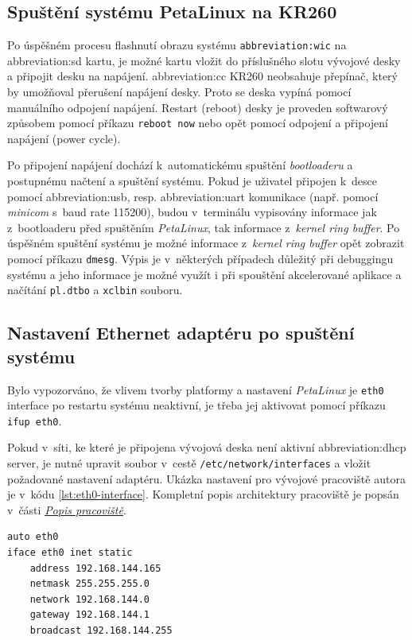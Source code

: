 \documentclass[a4paper, twoside, 11pt]{article}
\begin{document}
	\subsection{Spuštění systému PetaLinux na KR260}
		Po úspěšném procesu flashnutí obrazu systému \texttt{\gls{abbreviation:wic}} na \gls{abbreviation:sd} kartu, je možné kartu vložit do příslušného slotu vývojové desky a připojit desku na napájení. \gls{abbreviation:cc} KR260 neobsahuje přepínač, který by umožňoval přerušení napájení desky. Proto se deska vypíná pomocí manuálního odpojení napájení. Restart (reboot) desky je proveden softwarový způsobem pomocí příkazu \texttt{reboot now} nebo opět pomocí odpojení a připojení napájení (power cycle).\par
		Po připojení napájení dochází k~automatickému spuštění \textit{bootloaderu} a postupnému načtení a spuštění systému. Pokud je uživatel připojen k~desce pomocí \gls{abbreviation:usb}, resp. \gls{abbreviation:uart} komunikace (např. pomocí \textit{minicom} s~baud rate 115200), budou v~terminálu vypisovány informace jak z~bootloaderu před spuštěním \textit{PetaLinux}, tak informace z~\textit{kernel ring buffer}. Po úspěšném spuštění systému je možné informace z~\textit{kernel ring buffer} opět zobrazit pomocí příkazu \texttt{dmesg}. Výpis je v~některých případech důležitý při debuggingu systému a jeho informace je možné využít i při spouštění akcelerované aplikace a načítání \texttt{pl.dtbo} a \texttt{xclbin} souboru.\par

	\subsection{Nastavení Ethernet adaptéru po spuštění systému}
		Bylo vypozorváno, že vlivem tvorby platformy a nastavení \textit{PetaLinux} je \texttt{eth0} interface po restartu systému neaktivní, je třeba jej aktivovat pomocí příkazu \texttt{ifup eth0}.\par
		Pokud v~síti, ke které je připojena vývojová deska není aktivní \gls{abbreviation:dhcp} server, je nutné upravit soubor v~cestě \texttt{/etc/network/interfaces} a vložit požadované nastavení adaptéru. Ukázka nastavení pro vývojové pracoviště autora je v~kódu \ref{lst:eth0-interface}. Kompletní popis architektury pracoviště je popsán v~části \hyperref[sec:popis-pracoviste]{\textit{Popis pracoviště}}.\par

\begin{lstlisting}[language={sh}, caption={Nastavení eth0 interface pro KR260 vývojovou desku na vývojovém pracovišti autora.}, label={lst:eth0-interface}, morekeywords={auto, iface, address, netmask, network, gateway, broadcast}]
auto eth0
iface eth0 inet static
	address 192.168.144.165
	netmask 255.255.255.0
	network 192.168.144.0
	gateway 192.168.144.1
	broadcast 192.168.144.255\end{lstlisting}
\end{document}
